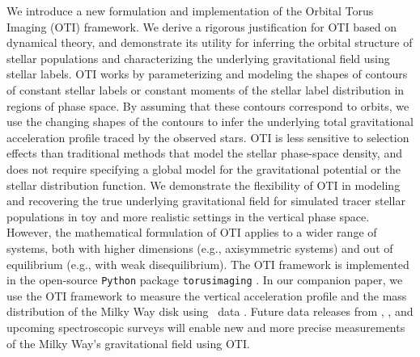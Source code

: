 \documentclass[modern]{aastex631}
\begin{document}
We introduce a new formulation and implementation of the Orbital Torus Imaging (OTI)
framework.
We derive a rigorous justification for OTI based on dynamical theory, and demonstrate
its utility for inferring the orbital structure of stellar populations and
characterizing the underlying gravitational field using stellar labels.
OTI works by parameterizing and modeling the shapes of contours of constant stellar
labels or constant moments of the stellar label distribution in regions of phase space.
By assuming that these contours correspond to orbits, we use the changing shapes of the
contours to infer the underlying total gravitational acceleration profile traced by the
observed stars.
OTI is less sensitive to selection effects than traditional methods that model the
stellar phase-space density, and does not require specifying a global model for the
gravitational potential or the stellar distribution function.
We demonstrate the flexibility of OTI in modeling and recovering the true underlying
gravitational field for simulated tracer stellar populations in toy and more realistic
settings in the vertical phase space.
However, the mathematical formulation of OTI applies to a wider range of systems, both
with higher dimensions (e.g., axisymmetric systems) and out of equilibrium (e.g., with
weak disequilibrium).
The OTI framework is implemented in the open-source \texttt{Python} package
\texttt{torusimaging} \citep{torusimaging:zenodo}.
In our companion paper, we use the OTI framework to measure the vertical acceleration
profile and the mass distribution of the Milky Way disk using \apogee\ data
\citep{Horta:2023}.
Future data releases from \gaia, \sdssv, and upcoming spectroscopic surveys will enable
new and more precise measurements of the Milky Way's gravitational field using OTI.
\end{document}
